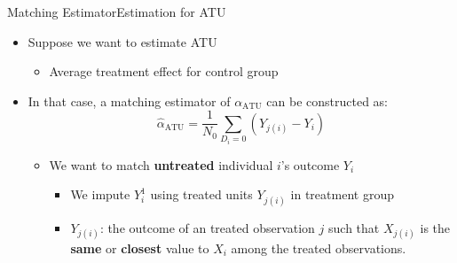 \documentclass[hyperref={pdfpagelabels=false}]{beamer}
\begin{document}
\begin{frame}{Matching Estimator}{Estimation for ATU}
	\begin{itemize}
		
		
		\item Suppose we want to estimate ATU 
				\vspace{0.3cm}
			\begin{itemize}
		\item Average treatment effect for control group
		
				\end{itemize}
		\vspace{0.3cm}
		\item In that case, a matching estimator of $\alpha_{\text{ATU}}$ can be constructed as:
		\begin{equation*}
		\hat{\alpha}_{\text{ATU}}=\dfrac{1}{N_0}\sum_{D_i=0}(Y_{j(i)}-Y_i)
		\end{equation*}
		
		\begin{itemize}
			
			\item We want to match \textbf{untreated} individual $i$'s outcome $Y_i$
					\vspace{0.3cm}
							\begin{itemize}
			\item We impute $Y^{1}_{i}$ using treated units $Y_{j(i)}$ in treatment group	
								\vspace{0.3cm}	
			\item $Y_{j(i)}$: the outcome of an treated observation $j$ such that $X_{j(i)}$ is the \textbf{same} or \textbf{closest} value to $X_i$ among the treated observations. 
					\end{itemize}
		\end{itemize}
		
	\end{itemize}
\end{frame}
\end{document}
